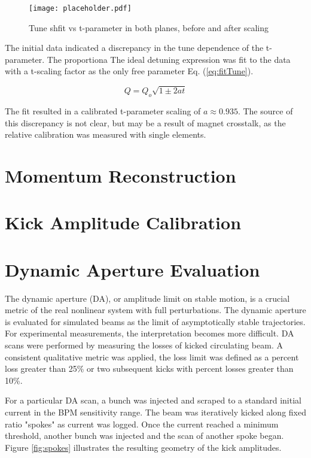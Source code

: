\begin{figure}
    \centering
    \texttt{[image: placeholder.pdf]}
    \caption{Tune shfit vs t-parameter in both planes, before and after scaling}
    \label{fig:dnTuneVsT}
\end{figure}

The initial data indicated a discrepancy in the tune dependence of the t-parameter. The proportiona The ideal detuning expression was fit to the data with a t-scaling factor as the only free parameter Eq. (\ref{eq:fitTune}). 

\begin{equation}
    Q = Q_o \sqrt{1\pm 2at}
    \label{eq:fitTune}
\end{equation}

The fit resulted in a calibrated t-parameter scaling of $a \approx 0.935$. The source of this discrepancy is not clear, but may be a result of magnet crosstalk, as the relative calibration was measured with single elements.

\section{Momentum Reconstruction} \label{sec:momReconst}

\section{Kick Amplitude Calibration} \label{sec:kickAmpCal}

\section{Dynamic Aperture Evaluation} \label{sec:daEval}
The dynamic aperture (DA), or amplitude limit on stable motion, is a crucial metric of the real nonlinear system with full perturbations. The dynamic aperture is evaluated for simulated beams as the limit of asymptotically stable trajectories. For experimental measurements, the interpretation becomes more difficult. DA scans were performed by measuring the losses of kicked circulating beam. A consistent qualitative metric was applied, the loss limit was defined as a percent loss greater than 25\% or two subsequent kicks with percent losses greater than 10\%.

For a particular DA scan, a bunch was injected and scraped to a standard initial current in the BPM sensitivity range. The beam was iteratively kicked along fixed ratio "spokes" as current was logged. Once the current reached a minimum threshold, another bunch was injected and the scan of another spoke began.  Figure \ref{fig:spokes} illustrates the resulting geometry of the kick amplitudes.

